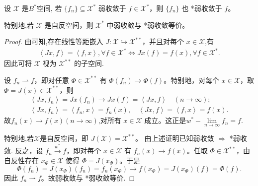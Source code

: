\documentclass[../../main.tex]{subfiles}%
\begin{document}
\begin{proposition}\label{proposition:共轭空间上的弱收敛可推出星弱收敛}
设 $\mathscr{X}$ 是$B^*$空间,
若 $\{f_n\} \subseteq \mathscr{X}^*$ 弱收敛于 $f \in \mathscr{X}^*$，则 $\{f_n\}$ 也 *弱收敛于 $f$。

特别地,若 $\mathscr{X}$ 是自反空间，则 $\mathscr{X}^*$ 中弱收敛与 *弱收敛等价。
\end{proposition}
\begin{proof}

由可知,存在线性等距嵌入 $J: \mathscr{X} \hookrightarrow \mathscr{X}^{**}$，并且对每个 $x \in \mathscr{X}$,有
\begin{align*}
\left< Jx,f \right> =\left< f,x \right> ,\forall f\in\mathscr{X}^*\iff Jx\left( f \right) =f\left( x \right) ,\forall f\in \mathscr{X} ^*.
\end{align*}
因此可将 $\mathscr{X}$ 视为 $\mathscr{X}^{**}$ 的子空间.
 
设 $f_n \rightharpoonup f$，即对任意 $\Phi \in \mathscr{X}^{**}$ 有 $\Phi(f_n) \to \Phi(f)$。特别地，对每个 $x \in \mathscr{X}$，取 $\Phi = J(x) \in \mathscr{X}^{**}$，则
\begin{gather*}
\left< Jx,f_n \right> =Jx\left( f_n \right) \rightarrow Jx\left( f \right) =\left< Jx,f \right> \quad \left( n\rightarrow \infty \right) ;
\\
\left< Jx,f_n \right> =\left< f_n,x \right> =f_n\left( x \right) ,\quad \left< Jx,f \right> =\left< f,x \right> =f\left( x \right) .
\end{gather*}
故$f_n(x)\to f(x)(n\to \infty)$,对所有 $x\in\mathscr{X}$ 成立。这正是$w^*-\lim\limits_{n\to\infty}f_n=f$.

特别地,若$\mathscr{X}$是自反空间，即 $J(\mathscr{X}) = \mathscr{X}^{**}$。  
由上述证明已知弱收敛 $\Rightarrow$ *弱收敛.
反之，设 $f_n \xrightarrow{w^*} f$，即对每个 $x\in\mathscr{X}$ 有 $f_n(x) \to f(x)$。任取 $\Phi \in \mathscr{X}^{**}$，由自反性存在 $x_\Phi \in \mathscr{X}$ 使得 $\Phi = J(x_\Phi)$。于是
\[
\Phi(f_n) = J(x_\Phi)(f_n) = f_n(x_\Phi) \to f(x_\Phi) = J(x_\Phi)(f) = \Phi(f).
\]
因此 $f_n \rightharpoonup f$。故弱收敛与 *弱收敛等价.
\end{proof}
\end{document}
